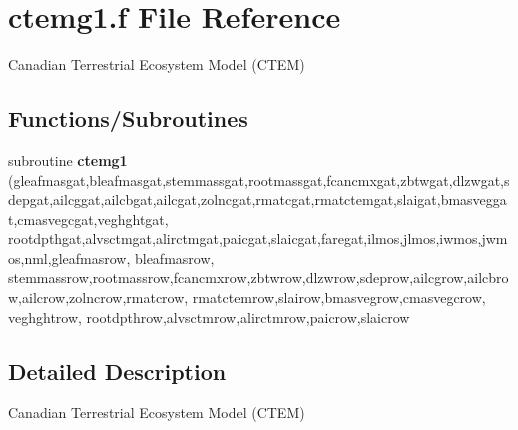 \hypertarget{ctemg1_8f}{}\section{ctemg1.\+f File Reference}
\label{ctemg1_8f}


Canadian Terrestrial Ecosystem Model (C\+T\+E\+M)  


\subsection*{Functions/\+Subroutines}
\begin{DoxyCompactItemize}
\item 
\hypertarget{ctemg1_8f_a794d010ffeeb7dcf8e091651b16d80e3}{}subroutine {\bfseries ctemg1} (gleafmasgat,bleafmasgat,stemmassgat,rootmassgat,fcancmxgat,zbtwgat,dlzwgat,sdepgat,ailcggat,ailcbgat,ailcgat,zolncgat,rmatcgat,rmatctemgat,slaigat,bmasveggat,cmasvegcgat,veghghtgat, rootdpthgat,alvsctmgat,alirctmgat,paicgat,slaicgat,faregat,ilmos,jlmos,iwmos,jwmos,nml,gleafmasrow, bleafmasrow, stemmassrow,rootmassrow,fcancmxrow,zbtwrow,dlzwrow,sdeprow,ailcgrow,ailcbrow,ailcrow,zolncrow,rmatcrow, rmatctemrow,slairow,bmasvegrow,cmasvegcrow, veghghtrow, rootdpthrow,alvsctmrow,alirctmrow,paicrow,slaicrow\label{ctemg1_8f_a794d010ffeeb7dcf8e091651b16d80e3}

\end{DoxyCompactItemize}


\subsection{Detailed Description}
Canadian Terrestrial Ecosystem Model (C\+T\+E\+M) 

